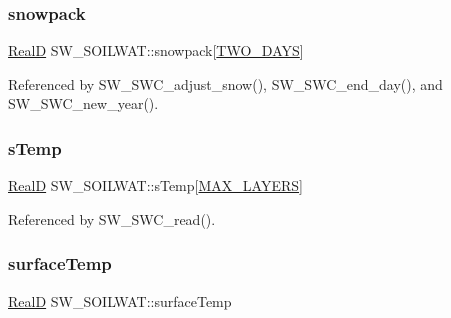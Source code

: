 \mbox{\label{struct_s_w___s_o_i_l_w_a_t_a62e49bd4b9572f84fa6089324d5599ef}} 
\subsubsection{\texorpdfstring{snowpack}{snowpack}}
{\footnotesize\ttfamily \hyperlink{generic_8h_af1c105fd5732f70b91ddaeda0cc340e3}{RealD} S\+W\+\_\+\+S\+O\+I\+L\+W\+A\+T\+::snowpack\mbox{[}\hyperlink{_s_w___defines_8h_aa13584938d6d242c32df06115a94b01a}{T\+W\+O\+\_\+\+D\+A\+YS}\mbox{]}}



Referenced by S\+W\+\_\+\+S\+W\+C\+\_\+adjust\+\_\+snow(), S\+W\+\_\+\+S\+W\+C\+\_\+end\+\_\+day(), and S\+W\+\_\+\+S\+W\+C\+\_\+new\+\_\+year().

\mbox{\label{struct_s_w___s_o_i_l_w_a_t_ad7083aac9276d0d6cd23c4b51a792f52}} 
\subsubsection{\texorpdfstring{s\+Temp}{sTemp}}
{\footnotesize\ttfamily \hyperlink{generic_8h_af1c105fd5732f70b91ddaeda0cc340e3}{RealD} S\+W\+\_\+\+S\+O\+I\+L\+W\+A\+T\+::s\+Temp\mbox{[}\hyperlink{_s_w___defines_8h_ade9d4b2ac5f29fe89ffea40e7c58c9d6}{M\+A\+X\+\_\+\+L\+A\+Y\+E\+RS}\mbox{]}}



Referenced by S\+W\+\_\+\+S\+W\+C\+\_\+read().

\mbox{\label{struct_s_w___s_o_i_l_w_a_t_a1805861c30af3374c3aa421ac4cc4893}} 
\subsubsection{\texorpdfstring{surface\+Temp}{surfaceTemp}}
{\footnotesize\ttfamily \hyperlink{generic_8h_af1c105fd5732f70b91ddaeda0cc340e3}{RealD} S\+W\+\_\+\+S\+O\+I\+L\+W\+A\+T\+::surface\+Temp}



